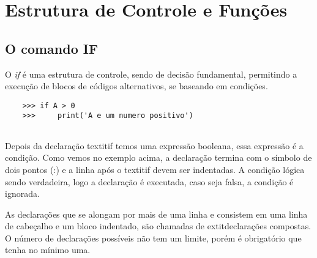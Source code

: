     \section{Estrutura de Controle e Funções}
	
            \subsection{O comando IF}
			O \textit{if} é uma estrutura de controle, sendo de decisão fundamental, permitindo a execução de blocos de códigos alternativos, se baseando em condições.
			\begin{lstlisting}
	>>> if A > 0
	>>> 	print('A e um numero positivo')
	
			\end{lstlisting}
			 Depois da declaração textit{if} temos uma expressão booleana, essa expressão é a condição. Como vemos no exemplo acima, a declaração termina com o símbolo de dois pontos (:) e a linha após o textit{if} devem ser indentadas. A condição lógica sendo verdadeira, logo a declaração é executada, caso seja falsa, a condição é ignorada.
			 
			 As declarações que se alongam por mais de uma linha e consistem em uma linha de cabeçalho e um bloco indentado, são chamadas de extit{declarações compostas}. O número de declarações possíveis não tem um limite, porém é obrigatório que tenha no mínimo uma. 
			 
